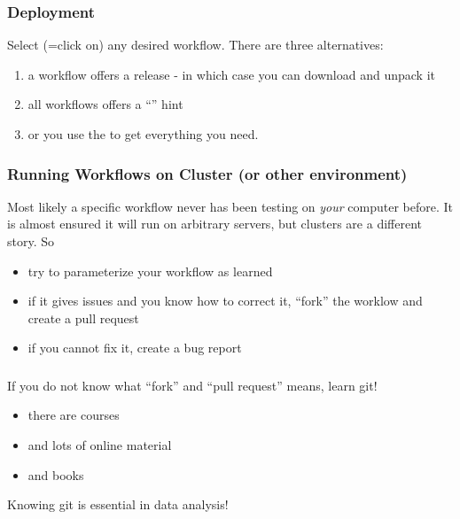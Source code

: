 \begin{frame}[fragile]
  \frametitle{Deployment}
  Select (=click on) any desired workflow. There are three alternatives:
  \begin{enumerate}[<+->]
   \item a workflow offers a release - in which case you can download and unpack it
   \item all workflows offers a ``'' hint
   \item or you use the  to get everything you need.
  \end{enumerate}
\end{frame}



\begin{frame}[fragile]
  \frametitle{Running Workflows on Cluster (or other environment)}
  Most likely a specific workflow never has been testing on \emph{your} computer before. It is almost ensured it will run on arbitrary servers, but clusters are a different story. \newline
  So
  \begin{itemize}[<+->]
   \item try to parameterize your workflow as learned
   \item if it gives issues and you know how to correct it, ``fork'' the worklow and create a pull request
   \item if you cannot fix it, create a bug report
  \end{itemize}
\end{frame}

\begin{frame}
  \frametitle{}
  If you do not know what ``fork'' and ``pull request'' means, learn git!
  \begin{itemize}[<+->]
   \item there are courses
   \item and lots of online material
   \item and books
  \end{itemize}
  \pause
  \begin{warning}
  	Knowing git is essential in data analysis!
  \end{warning}
\end{frame}


